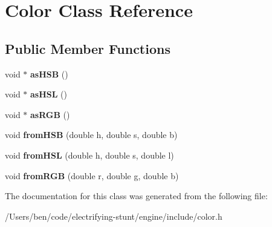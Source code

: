 \hypertarget{class_color}{}\section{Color Class Reference}
\label{class_color}
\subsection*{Public Member Functions}
\begin{DoxyCompactItemize}
\item 
\hypertarget{class_color_ad54fbfba0f6f4a4a30426bbf66835210}{}void $\ast$ {\bfseries as\+H\+S\+B} ()\label{class_color_ad54fbfba0f6f4a4a30426bbf66835210}

\item 
\hypertarget{class_color_a42b101f2bc15843adfdc7ab3f0b9994f}{}void $\ast$ {\bfseries as\+H\+S\+L} ()\label{class_color_a42b101f2bc15843adfdc7ab3f0b9994f}

\item 
\hypertarget{class_color_ad6c31f752f89c13611bae80ab25d17f6}{}void $\ast$ {\bfseries as\+R\+G\+B} ()\label{class_color_ad6c31f752f89c13611bae80ab25d17f6}

\item 
\hypertarget{class_color_a206e5e07c34b7a491f554692916961d1}{}void {\bfseries from\+H\+S\+B} (double h, double s, double b)\label{class_color_a206e5e07c34b7a491f554692916961d1}

\item 
\hypertarget{class_color_a19ae4eb90bb011dd065518aa8d8e8182}{}void {\bfseries from\+H\+S\+L} (double h, double s, double l)\label{class_color_a19ae4eb90bb011dd065518aa8d8e8182}

\item 
\hypertarget{class_color_a03800d4adddfc81b90c489b58240cd59}{}void {\bfseries from\+R\+G\+B} (double r, double g, double b)\label{class_color_a03800d4adddfc81b90c489b58240cd59}

\end{DoxyCompactItemize}


The documentation for this class was generated from the following file\+:\begin{DoxyCompactItemize}
\item 
/\+Users/ben/code/electrifying-\/stunt/engine/include/color.\+h\end{DoxyCompactItemize}
